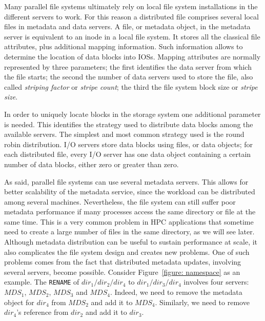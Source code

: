 Many parallel file systems ultimately rely on local file system installations in the different servers to work. For this reason a distributed file comprises several local files in metadata and data servers. A file, or 
metadata object, in the metadata server is equivalent to an inode in a local file system. It stores all the classical file attributes, plus additional mapping information. Such information allows to determine the location 
of data blocks into IOSs. Mapping attributes are normally represented by three parameters; the first identifies the data server from which the file starts; the second the number of data servers used to store the file, 
also called \textit{striping factor} or \textit{stripe count}; the third the file system block size or \textit{stripe size}. 

In order to uniquely locate blocks in the storage system one additional parameter is needed. This identifies the strategy used to distribute data blocks among the available servers. The simplest and most common strategy 
used is the round robin distribution. I/O servers store data blocks using files, or data objects; for each distributed file, every I/O server has one data object containing a certain number of data blocks, either zero or 
greater than zero.

As said, parallel file systems can use several metadata servers. This allows for better scalability of the metadata service, since the workload can be distributed among several machines. Nevertheless, the file system can 
still suffer poor metadata performance if many processes access the same directory or file at the same time. This is a very common problem in HPC applications that sometime need to create a large number of files in the same
directory, as we will see later. Although metadata distribution can be useful to sustain performance at scale, it also complicates the file system design and creates new problems. One of such problems comes from the fact that 
distributed metadata updates, involving several servers, become possible. Consider Figure~\ref{figure: namespace} as an example. The \texttt{RENAME} of $dir_1/dir_2/dir_4$ to $dir_1/dir_3/dir_4$ involves four servers: $MDS_1$, 
$MDS_2$, $MDS_3$ and $MDS_4$. Indeed, we need to remove the metadata object for $dir_4$ from $MDS_2$ and add it to $MDS_4$. Similarly, we need to remove $dir_4$'s reference from $dir_2$ and add it to $dir_3$.

